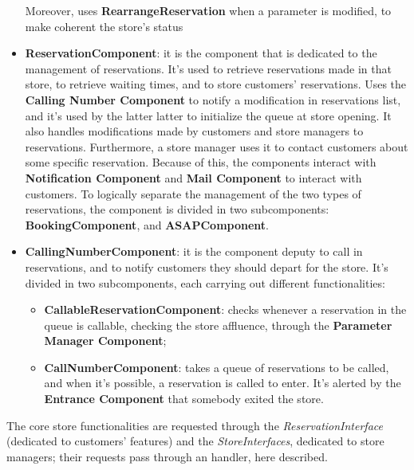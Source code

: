 \documentclass{article}
\begin{document}
\begin{itemize}
				Moreover, uses {\bfseries RearrangeReservation} when a parameter is modified, to make coherent the store’s status
				
				\item {\bfseries ReservationComponent}: it is the component that is dedicated to the management of reservations. It’s used to retrieve reservations made in that store, to retrieve waiting times, and to store customers’ reservations. Uses the {\bfseries Calling Number Component} to notify a modification in reservations list, and it’s used by the latter latter to initialize the queue at store opening. It also handles modifications made by customers and store managers to reservations. Furthermore, a store manager uses it to contact customers about some specific reservation. Because of this, the components interact with {\bfseries Notification Component} and {\bfseries Mail Component} to interact with customers. 
				To logically separate the management of the two types of reservations, the component is divided in two subcomponents: {\bfseries BookingComponent}, and {\bfseries ASAPComponent}.
				
				\item {\bfseries CallingNumberComponent}: it is the component deputy to call in reservations, and to notify customers they should depart for the store. It’s divided in two subcomponents, each carrying out different functionalities:
				
				\begin{itemize}
					\item {\bfseries CallableReservationComponent}: checks whenever a reservation in the queue is callable, checking the store affluence, through the {\bfseries Parameter Manager Component};
					
					\item {\bfseries CallNumberComponent}: takes a queue of reservations to be called, and when it’s possible, a reservation is called to enter. It’s alerted by the {\bfseries Entrance Component} that somebody exited the store.
				\end{itemize}
			\end{itemize}
		
			The core store functionalities are requested through the \emph{ReservationInterface} (dedicated to customers’ features) and the \emph{StoreInterfaces}, dedicated to store managers; their requests pass through an handler, here described. 
			
\end{document}
